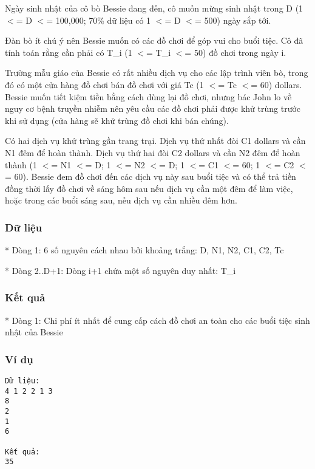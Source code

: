 



   Ngày sinh nhật của cô bò Bessie đang đến, cô muốn mừng sinh nhật trong D (1 $<$= D $<$= 100,000; 70\% dữ liệu có 1 $<$= D $<$= 500) ngày sắp tới.  

   Đàn bò ít chú ý nên Bessie muốn có các đồ chơi để góp vui cho buổi tiệc. Cô đã tính toán rằng cần phải có T\_i (1 $<$= T\_i $<$= 50) đồ chơi trong ngày i.  

   Trường mẫu giáo của Bessie có rất nhiều dịch vụ cho các lập trình viên bò, trong đó có một cửa hàng đồ chơi bán đồ chơi với giá Tc (1 $<$= Tc $<$= 60) dollars. Bessie muốn tiết kiệm tiền bằng cách dùng lại đồ chơi, nhưng bác John lo về nguy cơ bệnh truyền nhiễm nên yêu cầu các đồ chơi phải được khử trùng trước khi sử dụng (cửa hàng sẽ khử trùng đồ chơi khi bán chúng).  

   Có hai dịch vụ khử trùng gần trang trại. Dịch vụ thứ nhất đòi C1 dollars và cần N1 đêm để hoàn thành. Dịch vụ thứ hai đòi C2 dollars và cần N2 đêm để hoàn thành (1 $<$= N1 $<$= D; 1 $<$= N2 $<$= D; 1 $<$= C1 $<$= 60; 1 $<$= C2 $<$= 60). Bessie đem đồ chơi đến các dịch vụ này sau buổi tiệc và có thể trả tiền đồng thời lấy đồ chơi về sáng hôm sau nếu dịch vụ cần một đêm để làm việc, hoặc trong các buổi sáng sau, nếu dịch vụ cần nhiều đêm hơn.  

\subsubsection{    Dữ liệu   }

    * Dòng 1: 6 số nguyên cách nhau bởi khoảng trắng: D, N1, N2, C1, C2, Tc   

    * Dòng 2..D+1: Dòng i+1 chứa một số nguyên duy nhất: T\_i   

\subsubsection{    Kết quả   }

    * Dòng 1: Chi phí ít nhất để cung cấp cách đồ chơi an toàn cho các buổi tiệc sinh nhật của Bessie   

\subsubsection{    Ví dụ   }
\begin{verbatim}
Dữ liệu:
4 1 2 2 1 3
8
2
1
6

Kết quả:
35
\end{verbatim}